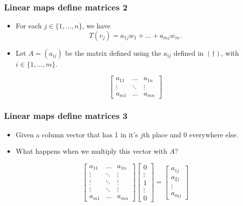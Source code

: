 \documentclass[handout]{beamer}
\begin{document}
\begin{frame}
\frametitle{Linear maps define matrices 2}
\begin{itemize}
\item For each $j\in\{1,\ldots,n\}$, we have 
\[\tag{$\dagger$} T(v_j) = a_{1j}w_1 + \ldots + a_{mj} w_m.\]\vspace{1cm}
\item Let $A=(a_{ij})$ be the matrix defined using the $a_{ij}$ defined in $(\dagger)$, with $i\in\{1,\ldots,m\}$. 

\[
\begin{bmatrix}
a_{11}  & \dots & a_{1n} \\
\vdots & \ddots & \vdots \\
a_{m1}  & \dots & a_{mn} 
\end{bmatrix}
\]
\end{itemize}
\end{frame}

\begin{frame}
\frametitle{Linear maps define matrices 3}
\begin{itemize}
\item Given a column vector that has 1 in it's $j$th place and 0 everywhere else. \vspace{0.3cm}
\item What happens when we multiply this vector with $A$?

\[
\begin{bmatrix}
a_{11}  & \dots & a_{1n} \\
\vdots & \ddots & \vdots \\
\vdots & \ddots & \vdots \\
\vdots & \ddots & \vdots \\
a_{m1}  & \dots & a_{mn} 
\end{bmatrix}
\begin{bmatrix}
0\\
\vdots\\
1\\
\vdots\\
0
\end{bmatrix}
= 
\begin{bmatrix}
a_{1j}\\
a_{2j}\\
\vdots\\
a_{mj}
\end{bmatrix}
\]
\end{itemize}
\end{frame}
\end{document}
